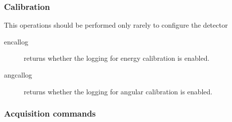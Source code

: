 \documentclass{article}
\begin{document}
\subsubsection{Calibration}
This operations should be performed only rarely to configure the detector

\begin{description}
   \item[encallog] returns whether the logging for energy calibration is enabled.
    \item[angcallog] returns whether the logging for angular calibration is enabled.  
\end{description}




\subsubsection{Acquisition commands}
\end{document}
